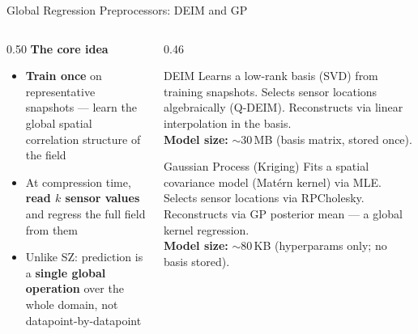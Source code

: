\documentclass[aspectratio=169, 11pt]{beamer}
\begin{document}
\begin{frame}{Global Regression Preprocessors: DEIM and GP}
\begin{columns}[T]

\begin{column}{0.50\textwidth}
  \textcolor{cteal}{\textbf{The core idea}}\vspace{0.25em}
  \begin{itemize}\setlength\itemsep{0.35em}\small
    \item \textbf{Train once} on representative snapshots --- learn the global spatial correlation structure of the field
    \item At compression time, \textbf{read $k$ sensor values} and regress the full field from them
    \item Unlike SZ: prediction is a \textbf{single global operation} over the whole domain, not datapoint-by-datapoint
  \end{itemize}
\end{column}

\begin{column}{0.46\textwidth}
  \begingroup
  \begin{block}{DEIM}
    \scriptsize
    Learns a low-rank basis (SVD) from training snapshots.
    Selects sensor locations algebraically (Q-DEIM).
    Reconstructs via linear interpolation in the basis.\\[2pt]
    \textbf{Model size:} $\sim$30\,MB (basis matrix, stored once).
  \end{block}
  \endgroup

  \vspace{0.4em}
  \begingroup
  \begin{block}{Gaussian Process (Kriging)}
    \scriptsize
    Fits a spatial covariance model (Mat\'{e}rn kernel) via MLE.
    Selects sensor locations via RPCholesky.
    Reconstructs via GP posterior mean --- a global kernel regression.\\[2pt]
    \textbf{Model size:} $\sim$80\,KB (hyperparams only; no basis stored).
  \end{block}
  \endgroup
\end{column}

\end{columns}
\end{frame}
\end{document}
